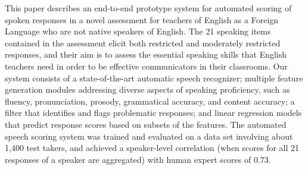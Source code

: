 This paper describes an end-to-end prototype system for automated scoring of spoken responses in a novel assessment for teachers of English as a Foreign Language who are not native speakers of English. The 21 speaking items contained in the assessment elicit both restricted and moderately restricted responses, and their aim is to assess the essential speaking skills that English teachers need in order to be effective communicators in their classrooms.  Our system consists of a state-of-the-art automatic speech recognizer; multiple feature generation modules addressing diverse aspects of speaking proficiency, such as fluency, pronunciation, prosody, grammatical accuracy, and content accuracy; a filter that identifies and flags problematic responses; and linear regression models that predict response scores based on subsets of the features. The automated speech scoring system was trained and evaluated on a data set involving about 1,400 test takers, and achieved a speaker-level correlation (when scores for all 21 responses of a speaker are aggregated) with human expert scores of 0.73.
